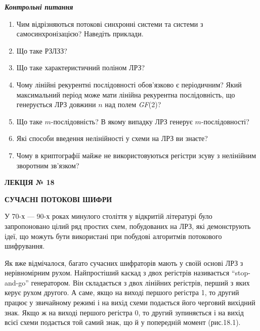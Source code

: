 \bigskip

{\centering\bfseries\itshape
Контрольні питання
\par}


\bigskip

\liststyleWWviiiNumlvi
\begin{enumerate}
\item Чим відрізняються потокові синхронні системи та системи з
самосинхронізацією? Наведіть приклади.
\item Що таке РЗЛЗЗ?
\item Що таке характеристичний поліном ЛРЗ?
\item Чому лінійні рекурентні послідовності обов’язково є періодичним? Який
максимальний період може мати лінійна рекурентна послідовність, що генерується
ЛРЗ довжини  ${n}$ над полем \textit{GF}(2)? 
\item Що таке  ${m}${}-послідовність? В якому випадку ЛРЗ генерує 
${m}${}-послідовності?
\item Які способи введення нелінійності у схеми на ЛРЗ ви знаєте?
\item Чому в криптографії майже не використовуються регістри зсуву з нелінійним
зворотним зв’язком?
\end{enumerate}

\bigskip


\bigskip


\bigskip

{\bfseries
ЛЕКЦІЯ № 18}


\bigskip

{\centering\bfseries
СУЧАСНІ  ПОТОКОВІ  ШИФРИ
\par}


\bigskip


\bigskip

У 70-х --- 90-х роках минулого століття у відкритій літературі було запропоновано
цілий ряд простих схем, побудованих на ЛРЗ, які демонструють ідеї, що можуть
бути використані при побудові алгоритмів потокового шифрування.

Як вже відмічалося, багато сучасних шифраторів мають у своїй основі ЛРЗ з
нерівномірним рухом. Найпростіший каскад з двох регістрів називається
“stop{}-and{}-go” генератором. Він складається з двох лінійних регістрів,
перший з яких керує рухом другого. А саме, якщо на виході першого регістра 1,
то другий працює у звичайному режимі і на вихід схеми подається його черговий
вихідний знак. Якщо ж на виході першого регістра 0, то другий зупиняється і на
вихід всієї схеми  подається той самий знак, що й у попередній момент
(рис.18.1).

